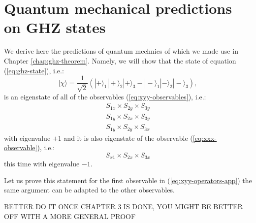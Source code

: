 \section{Quantum mechanical predictions on GHZ states}
We derive here the predictions of quantum mechnics of which we made use in Chapter \ref{chap:ghz-theorem}. Namely, we will show that the state of equation (\ref{eq:ghz-state}), i.e.:
\begin{equation*}
  |\chi\rangle = \frac{1}{\sqrt{2}} \left( |+\rangle_1 |+\rangle_2 |+\rangle_3 - |-\rangle_1 |-\rangle_2 |-\rangle_3 \right),
\end{equation*}
is an eigenstate of all of the observables (\ref{eq:xyy-observables}), i.e.:
\begin{equation}
  \begin{split}
    S_{1x} \times S_{2y} \times S_{3y}\\
    S_{1y} \times S_{2x} \times S_{3y}\\
    S_{1y} \times S_{2y} \times S_{3x}
  \end{split}
  \label{eq:xyy-operators-app}
\end{equation}
with eigenvalue $+ 1$ and it is also eigenstate of the observable (\ref{eq:xxx-observable}), i.e.:
\begin{equation*}
  S_{x1} \times S_{2x} \times S_{3x}
\end{equation*}
this time with eigenvalue $- 1$.

Let us prove this statement for the first observable in (\ref{eq:xyy-operators-app}) the same argument can be adapted to the other observables.

BETTER DO IT ONCE CHAPTER 3 IS DONE, YOU MIGHT BE BETTER OFF WITH A MORE GENERAL PROOF
